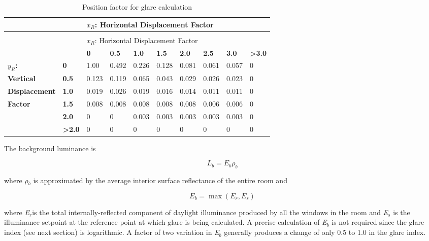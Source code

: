 \begin{longtable}[c]{p{1.0in}p{0.4in}p{0.4in}p{0.4in}p{0.4in}p{0.4in}p{0.4in}p{0.4in}p{0.4in}p{0.4in}}
\caption{Position factor for glare calculation \label{table:position-factor-for-glare-calculation}} \tabularnewline
\toprule 
            &      & \multicolumn{8}{l}{$x_R$: Horizontal Displacement Factor} \tabularnewline
\cmidrule(r){2-9}
\endfirsthead

\caption[]{Position factor for glare calculation} \tabularnewline
\toprule
            &      &\multicolumn{8}{l}{$x_R$: Horizontal Displacement Factor} \tabularnewline
\cmidrule(r){2-9}
\endhead

            &      & \textbf{0}     & \textbf{0.5}   & \textbf{1.0}   & \textbf{1.5}   & \textbf{2.0}   & \textbf{2.5}   & \textbf{3.0}   & \textbf{>3.0} \tabularnewline
\textbf{$y_R$:}      & \textbf{0}    & 1.00  & 0.492 & 0.226 & 0.128 & 0.081 & 0.061 & 0.057 & 0 \tabularnewline
\textbf{Vertical}    & \textbf{0.5}  & 0.123 & 0.119 & 0.065 & 0.043 & 0.029 & 0.026 & 0.023 & 0 \tabularnewline
\textbf{Displacement}  & \textbf{1.0}  & 0.019 & 0.026 & 0.019 & 0.016 & 0.014 & 0.011 & 0.011 & 0 \tabularnewline
\textbf{Factor}      & \textbf{1.5}  & 0.008 & 0.008 & 0.008 & 0.008 & 0.008 & 0.006 & 0.006 & 0 \tabularnewline
            & \textbf{2.0}  & 0     & 0     & 0.003 & 0.003 & 0.003 & 0.003 & 0.003 & 0 \tabularnewline
            & \textbf{>2.0} & 0     & 0     & 0     & 0     & 0     & 0     & 0     & 0 \tabularnewline
\bottomrule
\end{longtable}

The background luminance is

\begin{equation}
{L_b} = {E_b}{\rho_b}
\end{equation}

where \emph{$\rho$\(_{b}\)} is approximated by the average interior surface reflectance of the entire room and

\begin{equation}
{E_b} = \max ({E_r},{E_s})
\end{equation}

where \emph{E\(_{r}\)}is the total internally-reflected component of daylight illuminance produced by all the windows in the room and \emph{E\(_{s}\)} is the illuminance setpoint at the reference point at which glare is being calculated. A precise calculation of \emph{E\(_{b}\)} is not required since the glare index (see next section) is logarithmic. A factor of two variation in \emph{E\(_{b}\)} generally produces a change of only 0.5 to 1.0 in the glare index.

